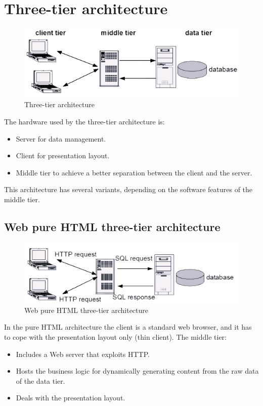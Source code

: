 \documentclass[12pt, a4paper]{report}
\begin{document}
    \section{Three-tier architecture}
    \begin{figure}[H]
        \centering
        \includegraphics[width=0.5\linewidth]{images/tt.png}
        \caption{Three-tier architecture}
    \end{figure}
    The hardware used by the three-tier architecture is: 
    \begin{itemize}
        \item Server for data management. 
        \item Client for presentation layout. 
        \item Middle tier to achieve a better separation between the client and the server. 
    \end{itemize}
    This architecture has several variants, depending on the software features of the middle tier. 
    
    \subsection{Web pure HTML three-tier architecture}
    \begin{figure}[H]
        \centering
        \includegraphics[width=0.5\linewidth]{images/ttph.png}
        \caption{Web pure HTML three-tier architecture}
    \end{figure}
    In the pure HTML architecture the client is a standard web browser, and it has to cope with the presentation layout only (thin client). The middle tier: 
    \begin{itemize}
        \item Includes a Web server that exploits HTTP.
        \item Hosts the business logic for dynamically generating content from the raw data of the data tier. 
        \item Deals with the presentation layout. 
    \end{itemize}
\end{document}
